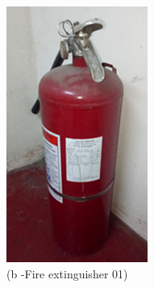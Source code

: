 \begin{figure}
\begin{minipage}[b]{0.25\linewidth}
				\includegraphics[width=\textwidth]{figures/fig_ch04_fdas_fireex01}
		\caption*{(b -Fire extinguisher 01)}
	\end{minipage}
	\hspace{0.05cm}
	\begin{minipage}[b]{0.25\linewidth}
		\centering

\end{minipage}
\end{figure}
